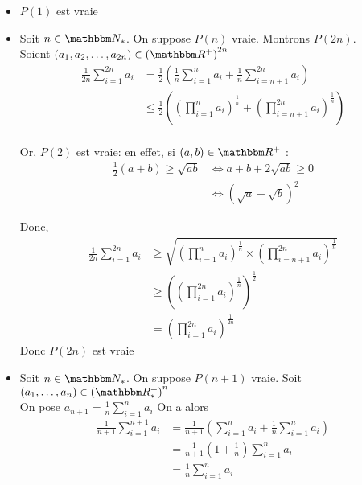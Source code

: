 \begin{itemize}
	\item $P(1)$ est vraie
	\item  Soit $n \in \N_*$. On suppose $P(n)$ vraie. Montrons $P(2n)$.\\
		Soient $(a_1,a_2, \ldots, a_{2n}) \in  \left( \R^+ \right) ^{2n}$ 
		\begin{align*}
			\frac{1}{2n}\sum_{i=1}^{2n} a_i &= \frac{1}{2} \left( \frac{1}{n} \sum_{i=1}^{n} a_i + \frac{1}{n} \sum_{i=n+1}^{2n} a_i \right)  \\
																			&\le \frac{1}{2}\left( \left( \prod_{i=1}^{n} a_i  \right) ^{\frac{1}{n}} + \left( \prod_{i = n+1}^{2n} a_i  \right) ^{\frac{1}{n}} \right) \\
		\end{align*}

		Or, $P(2)$ est vraie: en effet, si $(a,b) \in \R^+$ : 
		\begin{align*}
			\frac{1}{2}(a+b) \ge \sqrt{ab} &\iff a+ b+2\sqrt{ab} \ge 0\\
																		 &\iff \left( \sqrt{a} +\sqrt{b}  \right) ^2
		\end{align*}

		Donc, 
		\begin{align*}
			\frac{1}{2n} \sum_{i=1}^{2n} a_i &\ge \sqrt{\left( \prod_{i=1}^{n} a_i  \right) ^{\frac{1}{n}} \times \left( \prod_{i=n+1}^{2n} a_i  \right) ^{\frac{1}{n}}} \\
			&\ge  \left( \left( \prod_{i=1}^{2n} a_i  \right) ^{\frac{1}{n}} \right) ^{\frac{1}{2}} \\
			&= \left( \prod_{i=1}^{2n} a_i  \right) ^{\frac{1}{2n}}
		\end{align*}
		Donc $P(2n)$ est vraie
	\item Soit $n \in \N_*$. On suppose $P(n+1)$ vraie. Soit $(a_1, \ldots, a_n) \in \left( \R^+_* \right) ^n$ \\
		On pose $a_{n+1} = \frac{1}{n} \sum^n_{i=1} a_i$
		On a alors
		\begin{align*}
			\frac{1}{n+1}\sum^{n+1}_{i=1} a_i &= \frac{1}{n+1}\left( \sum^{n}_{i=1} a_i + \frac{1}{n} \sum^{n}_{i=1} a_i \right)  \\
			&= \frac{1}{n+1}\left( 1+\frac{1}{n} \right) \sum^{n}_{i=1} a_i \\
			&= \frac{1}{n} \sum^{n}_{i=1} a_i \\
		\end{align*}


\end{itemize}
